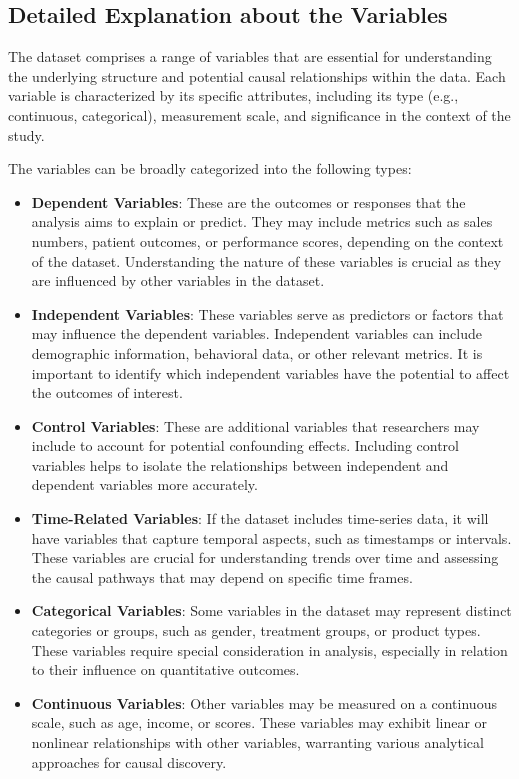 \documentclass{article}
\begin{document}
\subsection{Detailed Explanation about the Variables}
The dataset comprises a range of variables that are essential for understanding the underlying structure and potential causal relationships within the data. Each variable is characterized by its specific attributes, including its type (e.g., continuous, categorical), measurement scale, and significance in the context of the study.

The variables can be broadly categorized into the following types:

\begin{itemize}
    \item \textbf{Dependent Variables}: These are the outcomes or responses that the analysis aims to explain or predict. They may include metrics such as sales numbers, patient outcomes, or performance scores, depending on the context of the dataset. Understanding the nature of these variables is crucial as they are influenced by other variables in the dataset.
    
    \item \textbf{Independent Variables}: These variables serve as predictors or factors that may influence the dependent variables. Independent variables can include demographic information, behavioral data, or other relevant metrics. It is important to identify which independent variables have the potential to affect the outcomes of interest.
    
    \item \textbf{Control Variables}: These are additional variables that researchers may include to account for potential confounding effects. Including control variables helps to isolate the relationships between independent and dependent variables more accurately.
    
    \item \textbf{Time-Related Variables}: If the dataset includes time-series data, it will have variables that capture temporal aspects, such as timestamps or intervals. These variables are crucial for understanding trends over time and assessing the causal pathways that may depend on specific time frames.
    
    \item \textbf{Categorical Variables}: Some variables in the dataset may represent distinct categories or groups, such as gender, treatment groups, or product types. These variables require special consideration in analysis, especially in relation to their influence on quantitative outcomes.
    
    \item \textbf{Continuous Variables}: Other variables may be measured on a continuous scale, such as age, income, or scores. These variables may exhibit linear or nonlinear relationships with other variables, warranting various analytical approaches for causal discovery.
\end{itemize}
\end{document}
